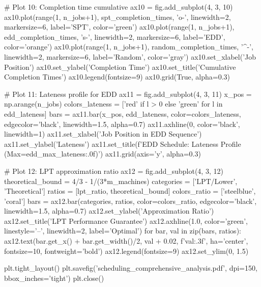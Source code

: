 \documentclass[a4paper, 11pt]{article}
\begin{document}
\begin{pycode}
# Plot 10: Completion time cumulative
ax10 = fig.add_subplot(4, 3, 10)
ax10.plot(range(1, n_jobs+1), spt_completion_times, 'o-', linewidth=2, markersize=6,
         label='SPT', color='green')
ax10.plot(range(1, n_jobs+1), edd_completion_times, 's-', linewidth=2, markersize=6,
         label='EDD', color='orange')
ax10.plot(range(1, n_jobs+1), random_completion_times, '^-', linewidth=2, markersize=6,
         label='Random', color='gray')
ax10.set_xlabel('Job Position')
ax10.set_ylabel('Completion Time')
ax10.set_title('Cumulative Completion Times')
ax10.legend(fontsize=9)
ax10.grid(True, alpha=0.3)

# Plot 11: Lateness profile for EDD
ax11 = fig.add_subplot(4, 3, 11)
x_pos = np.arange(n_jobs)
colors_lateness = ['red' if l > 0 else 'green' for l in edd_lateness]
bars = ax11.bar(x_pos, edd_lateness, color=colors_lateness, edgecolor='black',
               linewidth=1.5, alpha=0.7)
ax11.axhline(0, color='black', linewidth=1)
ax11.set_xlabel('Job Position in EDD Sequence')
ax11.set_ylabel('Lateness')
ax11.set_title(f'EDD Schedule: Lateness Profile (Max={edd_max_lateness:.0f})')
ax11.grid(axis='y', alpha=0.3)

# Plot 12: LPT approximation ratio
ax12 = fig.add_subplot(4, 3, 12)
theoretical_bound = 4/3 - 1/(3*m_machines)
categories = ['LPT/Lower\nBound', 'Theoretical\nBound']
ratios = [lpt_ratio, theoretical_bound]
colors_ratio = ['steelblue', 'coral']
bars = ax12.bar(categories, ratios, color=colors_ratio, edgecolor='black',
               linewidth=1.5, alpha=0.7)
ax12.set_ylabel('Approximation Ratio')
ax12.set_title('LPT Performance Guarantee')
ax12.axhline(1.0, color='green', linestyle='--', linewidth=2, label='Optimal')
for bar, val in zip(bars, ratios):
    ax12.text(bar.get_x() + bar.get_width()/2, val + 0.02, f'{val:.3f}',
            ha='center', fontsize=10, fontweight='bold')
ax12.legend(fontsize=9)
ax12.set_ylim(0, 1.5)

plt.tight_layout()
plt.savefig('scheduling_comprehensive_analysis.pdf', dpi=150, bbox_inches='tight')
plt.close()
\end{pycode}
\end{document}
